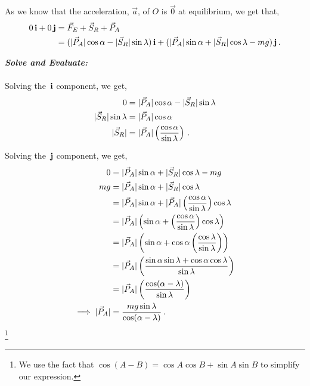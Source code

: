 \begin{subquestions}
\begin{subsubquestions}
	As we know that the acceleration, $\vec{a}$, of $O$ is $\vec{0}$ at equilibrium, we get that,
	\begin{align}
		0\,\mathbf{i} + 0\,\mathbf{j} & = \vec{F}_{E} + \vec{S}_{R} + \vec{P}_{A} \nonumber \\
                        & = (|\vec{P}_{A}|\cos{\alpha} - |\vec{S}_{R}|\sin{\lambda})\,\mathbf{i} + (|\vec{P}_{A}|\sin{\alpha} + |\vec{S}_{R}|\cos{\lambda} - mg)\,\mathbf{j} \,.		
	\end{align}



	\textbf{\textit{Solve and Evaluate:}} \\ \\
	Solving the $\,\mathbf{i}$ component, we get,
	\begin{align}
		0 & = |\vec{P}_{A}|\cos{\alpha} - |\vec{S}_{R}|\sin{\lambda} \nonumber \\
		|\vec{S}_{R}|\sin{\lambda} & = |\vec{P}_{A}|\cos{\alpha} \nonumber \\
		|\vec{S}_{R}| & = |\vec{P}_{A}| \left(\frac{\cos{\alpha}}{\sin{\lambda}}\right) \,.
	\end{align}
	
	Solving the $\,\mathbf{j}$ component, we get,
	\begin{align}
		0 & = |\vec{P}_{A}|\sin{\alpha} + |\vec{S}_{R}|\cos{\lambda} - mg \nonumber \\
		mg & = |\vec{P}_{A}|\sin{\alpha} + |\vec{S}_{R}|\cos{\lambda} \nonumber \\
		 & = |\vec{P}_{A}|\sin{\alpha} + |\vec{P}_{A}|\left(\frac{\cos{\alpha}}{\sin{\lambda}}\right)\cos{\lambda} \nonumber \\
		 & = |\vec{P}_{A}|\left(\sin{\alpha} + \left(\frac{\cos{\alpha}}{\sin{\lambda}}\right)\cos{\lambda}\right) \nonumber \\
		 & = |\vec{P}_{A}|\left(\sin{\alpha} + \cos{\alpha}\left(\frac{\cos{\lambda}}{\sin{\lambda}}\right)\right) \nonumber \\
		 & = |\vec{P}_{A}|\left(\frac{\sin{\alpha}\sin{\lambda}+\cos{\alpha}\cos{\lambda}}{\sin{\lambda}}\right) \nonumber \\
		 & = |\vec{P}_{A}|\left(\frac{\cos(\alpha - \lambda)}{\sin{\lambda}}\right) \nonumber \\
		\implies |\vec{P}_{A}| & = \frac{mg \sin{\lambda}}{\cos(\alpha-\lambda)} \,.
	\end{align} \footnote{We use the fact that $\cos(A-B)=\cos{A}\cos{B} + \sin{A}\sin{B}$ to simplify our expression.}


\end{subsubquestions}
\end{subquestions}
